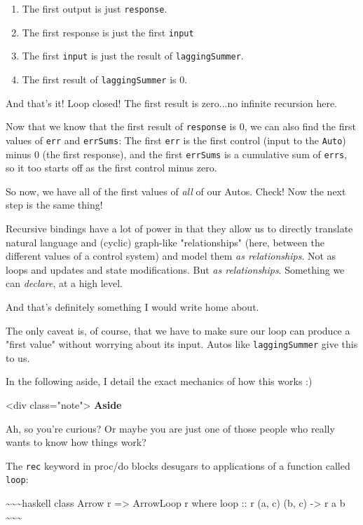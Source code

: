\documentclass[]{article}
\begin{document}
\begin{enumerate}
\tightlist
\item
  The first output is just \texttt{response}.
\item
  The first response is just the first \texttt{input}
\item
  The first \texttt{input} is just the result of \texttt{laggingSummer}.
\item
  The first result of \texttt{laggingSummer} is 0.
\end{enumerate}

And that's it! Loop closed! The first result is zero...no infinite recursion
here.

Now that we know that the first result of \texttt{response} is 0, we can also
find the first values of \texttt{err} and \texttt{errSums}: The first
\texttt{err} is the first control (input to the \texttt{Auto}) minus 0 (the
first response), and the first \texttt{errSums} is a cumulative sum of
\texttt{errs}, so it too starts off as the first control minus zero.

So now, we have all of the first values of \emph{all} of our Autos. Check! Now
the next step is the same thing!

Recursive bindings have a lot of power in that they allow us to directly
translate natural language and (cyclic) graph-like "relationships" (here,
between the different values of a control system) and model them \emph{as
relationships}. Not as loops and updates and state modifications. But \emph{as
relationships}. Something we can \emph{declare}, at a high level.

And that's definitely something I would write home about.

The only caveat is, of course, that we have to make sure our loop can produce a
"first value" without worrying about its input. Autos like
\texttt{laggingSummer} give this to us.

In the following aside, I detail the exact mechanics of how this works :)

\textless{}div class="note"\textgreater{} \textbf{Aside}

Ah, so you're curious? Or maybe you are just one of those people who really
wants to know how things work?

The \texttt{rec} keyword in proc/do blocks desugars to applications of a
function called \texttt{loop}:

\textasciitilde{}\textasciitilde{}\textasciitilde{}haskell class Arrow r
=\textgreater{} ArrowLoop r where loop :: r (a, c) (b, c) -\textgreater{} r a b
\textasciitilde{}\textasciitilde{}\textasciitilde{}
\end{document}
